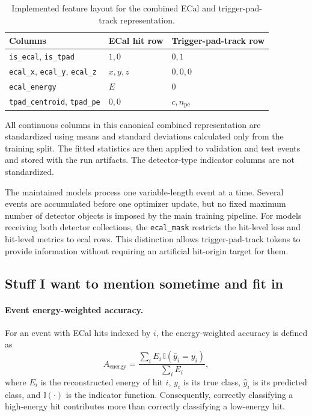 \begin{table}[H]
    \centering
    \caption{Implemented feature layout for the combined ECal and
    trigger-pad-track representation.}
    \label{tab:combined_features}
    \begin{tabular}{lll}
        \hline
        Columns & ECal hit row & Trigger-pad-track row \\
        \hline
        \texttt{is\_ecal}, \texttt{is\_tpad} & \(1,0\) & \(0,1\) \\
        \texttt{ecal\_x}, \texttt{ecal\_y}, \texttt{ecal\_z} &
            \(x,y,z\) & \(0,0,0\) \\
        \texttt{ecal\_energy} & \(E\) & \(0\) \\
        \texttt{tpad\_centroid}, \texttt{tpad\_pe} &
            \(0,0\) & \(c,n_{\mathrm{pe}}\) \\
        \hline
    \end{tabular}
\end{table}

All continuous columns in this canonical combined representation are
standardized using means and standard deviations calculated only from the
training split. The fitted statistics are then applied to validation and test
events and stored with the run artifacts. The detector-type indicator columns
are not standardized.

The maintained models process one variable-length event at a time. Several
events are accumulated before one optimizer update, but no fixed maximum
number of detector objects is imposed by the main training pipeline. For
models receiving both detector collections, the \texttt{ecal\_mask} restricts
the hit-level loss and hit-level metrics to \gls{ecal} rows. This distinction
allows trigger-pad-track tokens to provide information without requiring an
artificial hit-origin target for them.

















\subsection{Stuff I want to mention sometime and fit in}


\paragraph{Event energy-weighted accuracy.}
For an event with ECal hits indexed by \(i\), the energy-weighted accuracy is
defined as
\[
A_{\mathrm{energy}}
=
\frac{
    \sum_i E_i\,\mathbb{I}\!\left(\hat{y}_i = y_i\right)
}{
    \sum_i E_i
},
\]
where \(E_i\) is the reconstructed energy of hit \(i\), \(y_i\) is its true
class, \(\hat{y}_i\) is its predicted class, and \(\mathbb{I}(\cdot)\) is the
indicator function. Consequently, correctly classifying a high-energy hit
contributes more than correctly classifying a low-energy hit.

